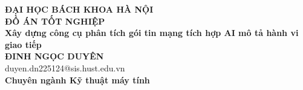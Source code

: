 \documentclass[DoAn.tex]{subfiles}
\begin{document}
\begin{titlepage}
\thispagestyle{empty}
\begin{center}

{\textbf{\large{ĐẠI HỌC BÁCH KHOA HÀ NỘI}}}\\[4cm]

{\textbf{\huge{ĐỒ ÁN TỐT NGHIỆP}}}\\[1cm]
{\textbf{\Large{Xây dựng công cụ phân tích gói tin mạng tích hợp AI mô tả hành vi giao tiếp}}}\\[1cm]

{\textbf{\large{ĐINH NGỌC DUYÊN}}}\\
{\large{duyen.dn225124@sis.hust.edu.vn}}\\[0.5cm]

{\textbf{\large{Chuyên ngành Kỹ thuật máy tính}}}\\

\vspace{4cm}
\begin{table}[H]
\centering
{}
\end{table}
\end{center}



\end{titlepage}
\end{document}

